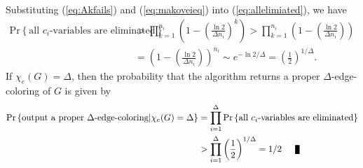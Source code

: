 \documentclass[11pt]{article}
\newenvironment{proof}[1][Proof]{\begin{trivlist}
\item[\hskip \labelsep {\bfseries #1}]}{\end{trivlist}}
\newcommand{\qed}{\nobreak \ifvmode \relax \else
      \ifdim\lastskip<1.5em \hskip-\lastskip
      \hskip1.5em plus0em minus0.5em \fi \nobreak
      \vrule height0.75em width0.5em depth0.25em\fi}
\begin{document}
\begin{proof}
Substituting (\ref{eq:Akfails}) and (\ref{eq:makoveieq}) into (\ref{eq:allelimiated}), we have
\begin{align}
\label{eq:allelimiatednumber}
\mbox{Pr}\left\{ \mbox{all } c_i \mbox{-variables are eliminated} \right\} &> \prod_{k=1}^{n_i} \left( 1- \left(  \frac{\ln{2}}{\Delta n_i} \right)^k \right)  > \prod_{k=1}^{n_i} \left( 1- \left(  \frac{\ln{2}}{\Delta n_i} \right) \right)  \nonumber \\
&= \left( 1- \left(  \frac{\ln{2}}{\Delta n_i} \right) \right) ^{n_i} \sim e^{-\ln{2}/\Delta} = \left(\frac{1}{2} \right)  ^{1/\Delta}.
\end{align}
If $\chi_e(G)=\Delta$, then the probability that the algorithm returns a proper $\Delta$-edge-coloring of $G$ is given by
\begin{align}
\mbox{Pr} \left\{ \mbox{output a proper $\Delta$-edge-coloring}  | \chi_e(G)=\Delta \right\} &= \prod_{i=1}^{\Delta} \mbox{Pr}\left\{ \mbox{all } c_i \mbox{-variables are eliminated} \right\}  \nonumber \\
&>  \prod_{i=1}^{\Delta}  \left(\frac{1}{2} \right)  ^{1/\Delta} =1/2 \nonumber \qed
\end{align}
\end{proof}
\end{document}
